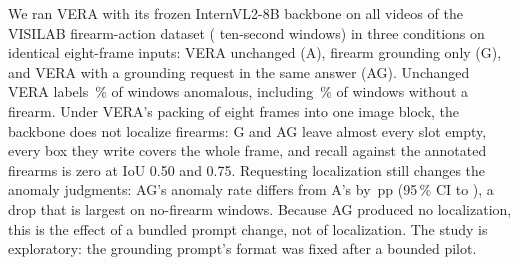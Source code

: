 We ran VERA with its frozen InternVL2-8B backbone on all  videos of the VISILAB firearm-action dataset ( ten-second windows) in three conditions on identical eight-frame inputs: VERA unchanged (A), firearm grounding only (G), and VERA with a grounding request in the same answer (AG). Unchanged VERA labels \,\% of windows anomalous, including \,\% of windows without a firearm. Under VERA's packing of eight frames into one image block, the backbone does not localize firearms: G and AG leave almost every slot empty, every box they write covers the whole frame, and recall against the  annotated firearms is zero at IoU 0.50 and 0.75. Requesting localization still changes the anomaly judgments: AG's anomaly rate differs from A's by \,pp (95\,\% CI  to ), a drop that is largest on no-firearm windows. Because AG produced no localization, this is the effect of a bundled prompt change, not of localization. The study is exploratory: the grounding prompt's format was fixed after a bounded pilot.
